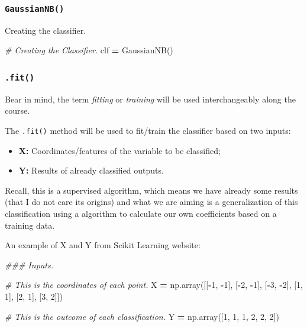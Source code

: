 \documentclass[]{book}
\newenvironment{Shaded}{\begin{snugshade}}{\end{snugshade}}
\newcommand{\DecValTok}[1]{\textcolor[rgb]{0.00,0.00,0.81}{#1}}
\newcommand{\CommentTok}[1]{\textcolor[rgb]{0.56,0.35,0.01}{\textit{#1}}}
\newcommand{\OperatorTok}[1]{\textcolor[rgb]{0.81,0.36,0.00}{\textbf{#1}}}
\newcommand{\NormalTok}[1]{#1}
\providecommand{\tightlist}{%
  \setlength{\itemsep}{0pt}\setlength{\parskip}{0pt}}
\begin{document}
\subsubsection*{\texorpdfstring{\texttt{GaussianNB()}}{GaussianNB()}}\label{gaussiannb}

Creating the classifier.

\begin{Shaded}
\begin{Highlighting}[]
\CommentTok{# Creating the Classifier.}
\NormalTok{clf }\OperatorTok{=}\NormalTok{ GaussianNB()}
\end{Highlighting}
\end{Shaded}

\subsubsection*{\texorpdfstring{\texttt{.fit()}}{.fit()}}\label{fit}

Bear in mind, the term \emph{fitting} or \emph{training} will be used
interchangeably along the course.

The \texttt{.fit()} method will be used to fit/train the classifier
based on two inputs:

\begin{itemize}
\tightlist
\item
  \textbf{X:} Coordinates/features of the variable to be classified;
\item
  \textbf{Y:} Results of already classified outputs.
\end{itemize}

Recall, this is a supervised algorithm, which means we have already some
results (that I do not care its origins) and what we are aiming is a
generalization of this classification using a algorithm to calculate our
own coefficients based on a training data.

An example of X and Y from Scikit Learning website:

\begin{Shaded}
\begin{Highlighting}[]
\CommentTok{### Inputs.}

\CommentTok{# This is the coordinates of each point.}
\NormalTok{X }\OperatorTok{=}\NormalTok{ np.array([[}\OperatorTok{-}\DecValTok{1}\NormalTok{, }\OperatorTok{-}\DecValTok{1}\NormalTok{], [}\OperatorTok{-}\DecValTok{2}\NormalTok{, }\OperatorTok{-}\DecValTok{1}\NormalTok{], [}\OperatorTok{-}\DecValTok{3}\NormalTok{, }\OperatorTok{-}\DecValTok{2}\NormalTok{], [}\DecValTok{1}\NormalTok{, }\DecValTok{1}\NormalTok{], [}\DecValTok{2}\NormalTok{, }\DecValTok{1}\NormalTok{], [}\DecValTok{3}\NormalTok{, }\DecValTok{2}\NormalTok{]])}

\CommentTok{# This is the outcome of each classification.}
\NormalTok{Y }\OperatorTok{=}\NormalTok{ np.array([}\DecValTok{1}\NormalTok{, }\DecValTok{1}\NormalTok{, }\DecValTok{1}\NormalTok{, }\DecValTok{2}\NormalTok{, }\DecValTok{2}\NormalTok{, }\DecValTok{2}\NormalTok{])}
\end{Highlighting}
\end{Shaded}
\end{document}

